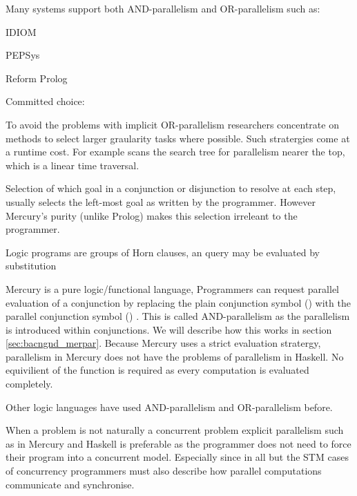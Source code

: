 Many systems support both AND-parallelism and OR-parallelism such as:

IDIOM

PEPSys

Reform Prolog

Committed choice:







To avoid the problems with implicit OR-parallelism researchers concentrate
on methods to select larger graularity tasks where possible.
Such stratergies come at a runtime cost.
For example \citet{hausman:1987:or} scans the search tree for parallelism
nearer the top, which is a linear time traversal.

Selection of which goal in a conjunction or disjunction to resolve at each
step,
usually selects the left-most goal as written by the programmer.
However Mercury's purity (unlike Prolog) makes this selection irreleant to
the programmer.


Logic programs are groups of Horn clauses,
an query may be evaluated by substitution  




\label{ref:parallel_conjunction}
Mercury is a pure logic/functional language,
Programmers can request parallel evaluation of a conjunction by replacing
the plain conjunction symbol (\samp{,})
with the parallel conjunction symbol (\samp{\&})
\citep{conway:2002:par,wang:2006:hons,wang:2011:dep-par}.
This is called AND-parallelism as the parallelism is introduced within
conjunctions.
We will describe how this works in section \ref{sec:bacngnd_merpar}.
Because Mercury uses a strict evaluation stratergy,
parallelism in Mercury does not have the problems of parallelism in Haskell.
No equivilient of the  function is required as every computation
is evaluated completely.

Other logic languages have used AND-parallelism and OR-parallelism before.


When a problem is not naturally a concurrent problem 
explicit parallelism such as in Mercury and Haskell
is preferable as the programmer does not need to force their program
into a concurrent model.
Especially since in all but the STM cases of concurrency programmers
must also describe how parallel computations communicate and
synchronise.

